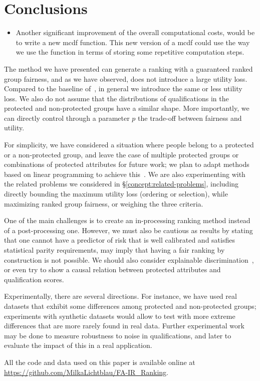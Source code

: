 \section{Conclusions}\label{sec:conclusions}
\begin{itemize}
	
	\item Another significant improvement of the overall computational costs, would be to write a new mcdf function. This new version of a mcdf could use the way we use the function in terms of storing some repetitive computation steps.
\end{itemize}

The method we have presented can generate a ranking with a guaranteed ranked group fairness, and as we have observed, does not introduce a large utility loss.
%
Compared to the baseline of~\citet{Feldman2015}, in general we introduce the same or less utility loss. We also do not assume that the distributions of qualifications in the protected and non-protected groups have a similar shape.
%
More importantly, we can directly control through a parameter $p$ the trade-off between fairness and utility.

For simplicity, we have considered a situation where people belong to a protected or a non-protected group, and leave the case of multiple protected groups or combinations of protected attributes for future work; we plan to adapt methods based on linear programming to achieve this~\cite{celis2017ranking}.
%
We are also experimenting with the related problems we considered in \S\ref{concept:related-problems}, including directly bounding the maximum utility loss (ordering or selection), while maximizing ranked group fairness, or weighing the three criteria.

One of the main challenges is to create an in-processing ranking method instead of a post-processing one. However, we must also be cautious as results by \citet{kleinberg2016inherent} stating that one cannot have a predictor of risk that is well calibrated and satisfies statistical parity requirements, may imply that having a fair ranking by construction is not possible. We should also consider explainable discrimination~\cite{vzliobaite2011handling}, or even try to show a causal relation between protected attributes and qualification scores.

Experimentally, there are several directions. For instance, we have used real datasets that exhibit some differences among protected and non-protected groups; experiments with synthetic datasets would allow to test with more extreme differences that are more rarely found in real data.
%
Further experimental work may be done to measure robustness to noise in qualifications, and later to evaluate the impact of this in a real application.

All the code and data used on this paper is available online at \url{https://github.com/MilkaLichtblau/FA-IR_Ranking}.

